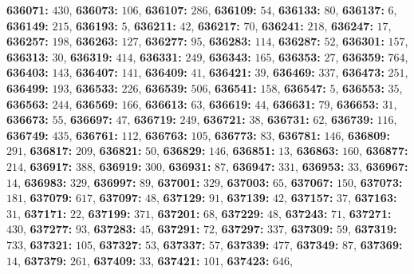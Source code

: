 \textsf{\bfseries 636071:} $430$, \textsf{\bfseries 636073:} $106$, \textsf{\bfseries 636107:} $286$, \textsf{\bfseries 636109:} $54$, \textsf{\bfseries 636133:} $80$, \textsf{\bfseries 636137:} $6$, \textsf{\bfseries 636149:} $215$, \textsf{\bfseries 636193:} $5$, \textsf{\bfseries 636211:} $42$, \textsf{\bfseries 636217:} $70$, \textsf{\bfseries 636241:} $218$, \textsf{\bfseries 636247:} $17$, \textsf{\bfseries 636257:} $198$, \textsf{\bfseries 636263:} $127$, \textsf{\bfseries 636277:} $95$, \textsf{\bfseries 636283:} $114$, \textsf{\bfseries 636287:} $52$, \textsf{\bfseries 636301:} $157$, \textsf{\bfseries 636313:} $30$, \textsf{\bfseries 636319:} $414$, \textsf{\bfseries 636331:} $249$, \textsf{\bfseries 636343:} $165$, \textsf{\bfseries 636353:} $27$, \textsf{\bfseries 636359:} $764$, \textsf{\bfseries 636403:} $143$, \textsf{\bfseries 636407:} $141$, \textsf{\bfseries 636409:} $41$, \textsf{\bfseries 636421:} $39$, \textsf{\bfseries 636469:} $337$, \textsf{\bfseries 636473:} $251$, \textsf{\bfseries 636499:} $193$, \textsf{\bfseries 636533:} $226$, \textsf{\bfseries 636539:} $506$, \textsf{\bfseries 636541:} $158$, \textsf{\bfseries 636547:} $5$, \textsf{\bfseries 636553:} $35$, \textsf{\bfseries 636563:} $244$, \textsf{\bfseries 636569:} $166$, \textsf{\bfseries 636613:} $63$, \textsf{\bfseries 636619:} $44$, \textsf{\bfseries 636631:} $79$, \textsf{\bfseries 636653:} $31$, \textsf{\bfseries 636673:} $55$, \textsf{\bfseries 636697:} $47$, \textsf{\bfseries 636719:} $249$, \textsf{\bfseries 636721:} $38$, \textsf{\bfseries 636731:} $62$, \textsf{\bfseries 636739:} $116$, \textsf{\bfseries 636749:} $435$, \textsf{\bfseries 636761:} $112$, \textsf{\bfseries 636763:} $105$, \textsf{\bfseries 636773:} $83$, \textsf{\bfseries 636781:} $146$, \textsf{\bfseries 636809:} $291$, \textsf{\bfseries 636817:} $209$, \textsf{\bfseries 636821:} $50$, \textsf{\bfseries 636829:} $146$, \textsf{\bfseries 636851:} $13$, \textsf{\bfseries 636863:} $160$, \textsf{\bfseries 636877:} $214$, \textsf{\bfseries 636917:} $388$, \textsf{\bfseries 636919:} $300$, \textsf{\bfseries 636931:} $87$, \textsf{\bfseries 636947:} $331$, \textsf{\bfseries 636953:} $33$, \textsf{\bfseries 636967:} $14$, \textsf{\bfseries 636983:} $329$, \textsf{\bfseries 636997:} $89$, \textsf{\bfseries 637001:} $329$, \textsf{\bfseries 637003:} $65$, \textsf{\bfseries 637067:} $150$, \textsf{\bfseries 637073:} $181$, \textsf{\bfseries 637079:} $617$, \textsf{\bfseries 637097:} $48$, \textsf{\bfseries 637129:} $91$, \textsf{\bfseries 637139:} $42$, \textsf{\bfseries 637157:} $37$, \textsf{\bfseries 637163:} $31$, \textsf{\bfseries 637171:} $22$, \textsf{\bfseries 637199:} $371$, \textsf{\bfseries 637201:} $68$, \textsf{\bfseries 637229:} $48$, \textsf{\bfseries 637243:} $71$, \textsf{\bfseries 637271:} $430$, \textsf{\bfseries 637277:} $93$, \textsf{\bfseries 637283:} $45$, \textsf{\bfseries 637291:} $72$, \textsf{\bfseries 637297:} $337$, \textsf{\bfseries 637309:} $59$, \textsf{\bfseries 637319:} $733$, \textsf{\bfseries 637321:} $105$, \textsf{\bfseries 637327:} $53$, \textsf{\bfseries 637337:} $57$, \textsf{\bfseries 637339:} $477$, \textsf{\bfseries 637349:} $87$, \textsf{\bfseries 637369:} $14$, \textsf{\bfseries 637379:} $261$, \textsf{\bfseries 637409:} $33$, \textsf{\bfseries 637421:} $101$, \textsf{\bfseries 637423:} $646$, 
